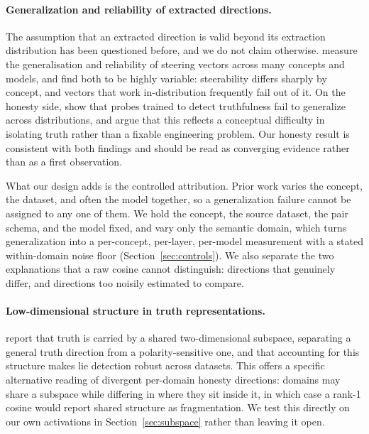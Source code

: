 \documentclass[11pt]{article}
\begin{document}
\paragraph{Generalization and reliability of extracted directions.}
The assumption that an extracted direction is valid beyond its extraction
distribution has been questioned before, and we do not claim otherwise.
\citet{tan2024analysing} measure the generalisation and reliability of
steering vectors across many concepts and models, and find both to be
highly variable: steerability differs sharply by concept, and vectors that
work in-distribution frequently fail out of it. On the honesty side,
\citet{levinstein2024still} show that probes trained to detect truthfulness
fail to generalize across distributions, and argue that this reflects a
conceptual difficulty in isolating truth rather than a fixable engineering
problem. Our honesty result is consistent with both findings and should be
read as converging evidence rather than as a first observation.

What our design adds is the controlled attribution. Prior work varies the
concept, the dataset, and often the model together, so a generalization
failure cannot be assigned to any one of them. We hold the concept, the
source dataset, the pair schema, and the model fixed, and vary only the
semantic domain, which turns generalization into a per-concept, per-layer,
per-model measurement with a stated within-domain noise floor
(Section~\ref{sec:controls}). We also separate the two explanations that a
raw cosine cannot distinguish: directions that genuinely differ, and
directions too noisily estimated to compare.

\paragraph{Low-dimensional structure in truth representations.}
\citet{burger2024truth} report that truth is carried by a shared
two-dimensional subspace, separating a general truth direction from a
polarity-sensitive one, and that accounting for this structure makes lie
detection robust across datasets. This offers a specific alternative reading
of divergent per-domain honesty directions: domains may share a subspace
while differing in where they sit inside it, in which case a rank-1 cosine
would report shared structure as fragmentation. We test this directly on our
own activations in Section~\ref{sec:subspace} rather than leaving it open.
\end{document}
